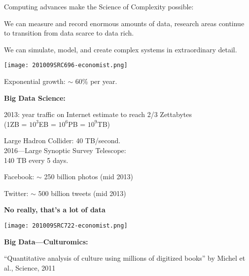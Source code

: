       Computing advances make the Science of Complexity possible:
      
      
        We can measure and record enormous amounts of data,
        research areas continue to transition from data scarce to data rich.
      
        We can simulate, model, and create complex systems
        in extraordinary detail.  
      
    
  







      
    
\begin{marginfigure}[]
\texttt{[image: 201009SRC696-economist.png]}
\end{marginfigure}

    
     
      Exponential growth: $\sim$ 60\% per year.
    
    
    \textbf{Big Data Science:}
    
     
      2013: year traffic on Internet estimate to reach 2/3 Zettabytes \\
      (1ZB = $10^3$EB = $10^6$PB = $10^9$TB)
     
      Large Hadron Collider: 40 TB/second.\\
     
      2016---Large Synoptic Survey Telescope:\\
      140 TB every 5 days.
     
      Facebook: $\sim$ 250 billion photos (mid 2013)
     
      Twitter: $\sim$ 500 billion tweets (mid 2013)
    
          
  

  \textbf{No really, that's a lot of data}

  
\begin{marginfigure}[]
\texttt{[image: 201009SRC722-economist.png]}
\end{marginfigure}



  \textbf{Big Data---Culturomics:}

  \small{``Quantitative analysis of culture using millions of
    digitized books'' by Michel et al., Science, 2011\cite{michel2011a}}

